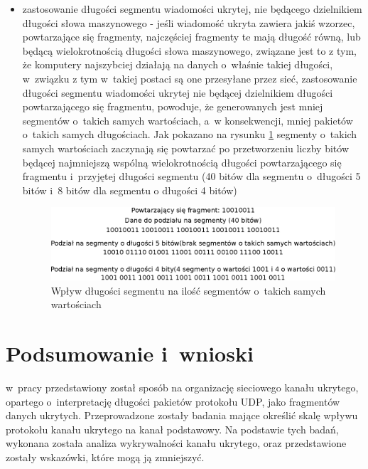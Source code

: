 \documentclass[a4paper, twoside, 12pt]{report}
\begin{document}
\begin{itemize}
           \item zastosowanie długości segmentu wiadomości ukrytej, nie będącego
               dzielnikiem długości słowa maszynowego - jeśli wiadomość ukryta
               zawiera jakiś wzorzec, powtarzające się fragmenty, najczęściej fragmenty
               te mają długość równą, lub będącą wielokrotnością długości słowa maszynowego,
               związane jest to z tym, że komputery najszybciej działają na danych
               o~właśnie takiej długości, w~związku z tym w~takiej postaci są one przesyłane
               przez sieć, zastosowanie długości segmentu wiadomości ukrytej nie będącej
               dzielnikiem długości powtarzającego się fragmentu, powoduje, że generowanych
               jest mniej segmentów o~takich samych wartościach, a~w konsekwencji,
               mniej pakietów o~takich samych długościach. Jak pokazano na rysunku \ref{REPETEDFRAGMENTS}
               segmenty o~takich samych wartościach zaczynają się powtarzać po
               przetworzeniu liczby bitów będącej najmniejszą wspólną wielokrotnością
               długości powtarzającego się fragmentu i~przyjętej długości segmentu
               (40 bitów dla segmentu o~długości 5 bitów i~8 bitów dla segmentu o
               długości 4 bitów)

                \begin{figure}[h]
                        \centering
                        \includegraphics[scale=0.75]{powtorzone_fragmenty}
                        \caption{Wpływ długości segmentu na ilość segmentów o~takich samych wartościach}
                        \label{REPETEDFRAGMENTS}
                \end{figure}
       \end{itemize}


\chapter{Podsumowanie i~wnioski}
    w~pracy przedstawiony został sposób na organizację sieciowego kanału ukrytego,
    opartego o~interpretację długości pakietów protokołu UDP, jako fragmentów
    danych ukrytych. Przeprowadzone zostały badania mające określić skalę wpływu
    protokołu kanału ukrytego na kanał podstawowy. Na podstawie tych badań, wykonana
    została analiza wykrywalności kanału ukrytego, oraz przedstawione zostały wskazówki,
    które mogą ją zmniejszyć.
\end{document}
